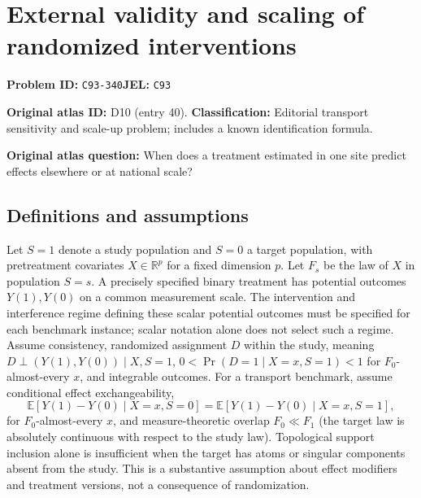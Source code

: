 \documentclass[11pt,a4paper]{article}
\begin{document}
\section*{External validity and scaling of randomized interventions}
\textbf{Problem ID:} \texttt{C93-340}\quad \textbf{JEL:} \texttt{C93}\par
\label{problem:OP-0040}
\label{audited:ECON-018}

\label{atlas:prob:D10}
\noindent\textbf{Original atlas ID:} D10 (entry 40). \textbf{Classification:} Editorial transport sensitivity and scale-up problem; includes a known identification formula.

\noindent\textbf{Original atlas question:} When does a treatment estimated in one site predict effects elsewhere or at national scale?

\subsection*{Definitions and assumptions}
Let $S=1$ denote a study population and $S=0$ a target population, with pretreatment covariates $X\in\mathbb R^p$ for a fixed dimension $p$. Let $F_s$ be the law of $X$ in population $S=s$. A precisely specified binary treatment has potential outcomes $Y(1),Y(0)$ on a common measurement scale. The intervention and interference regime defining these scalar potential outcomes must be specified for each benchmark instance; scalar notation alone does not select such a regime. Assume consistency, randomized assignment $D$ within the study, meaning $D\perp (Y(1),Y(0))\mid X,S=1$, $0<\Pr(D=1\mid X=x,S=1)<1$ for $F_0$-almost-every $x$, and integrable outcomes. For a transport benchmark, assume conditional effect exchangeability,
\[
 \mathbb E[Y(1)-Y(0)\mid X=x,S=0]
 =\mathbb E[Y(1)-Y(0)\mid X=x,S=1],
\]
for $F_0$-almost-every $x$, and measure-theoretic overlap $F_0\ll F_1$ (the target law is absolutely continuous with respect to the study law). Topological support inclusion alone is insufficient when the target has atoms or singular components absent from the study. This is a substantive assumption about effect modifiers and treatment versions, not a consequence of randomization.
\end{document}
